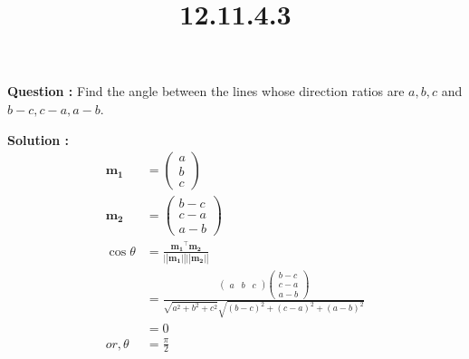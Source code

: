 \documentclass[12pt]{article}
\providecommand{\myvec}[1]{\ensuremath{\begin{pmatrix}#1\end{pmatrix}}}
\providecommand{\brak}[1]{\ensuremath{\left(#1\right)}}
\providecommand{\norm}[1]{\ensuremath{\lvert|#1\rvert|}}
\let\vec\mathbf
\begin{document}
\title{\textbf{12.11.4.3}}
\date{}
\maketitle
\textbf{Question :} Find the angle between the lines whose direction ratios are $a,b,c$ and $b-c,c-a,a-b$.

\textbf{Solution :}
    \begin{align}
    \vec{m _1} &= \myvec{a\\b\\c}\\
    \vec{m_2} &= \myvec{b-c\\c-a\\a-b}\\
    \cos{\theta}&= \frac{\vec{m_1}^{\top}\vec{m_2}}{\vec{\norm{m_1}\norm{m_2}}
   } \\
   &=\frac{\myvec{a&b&c}\myvec{b-c\\c-a\\a-b}}{\sqrt{a^2+b^2+c^2}\sqrt{\brak{b-c}^2+\brak{c-a}^2+\brak{a-b}^2}}\\
   &=0\\
   or,\theta&=\frac{\pi}{2}
    \end{align}
\end{document}
